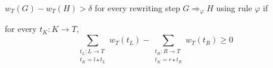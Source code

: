 \documentclass{beamer}
\begin{document}
\begin{frame}{ $w_T(G) - w_T(H) > \delta$ for every rewriting step $G \Rightarrow_\varphi H$ using rule $\varphi$ if}

  for every $t_K: K \rightarrow T$, 
    $$ \sum_{\substack{t_L: L \rightarrow T\\ t_K = l \star t_L}}
        w_T(t_L) -  \sum_{\substack{t_R: R \rightarrow T\\ t_K = r \star t_R}}
            w_T(t_R) \geq 0 $$ 


\end{frame}
\end{document}
